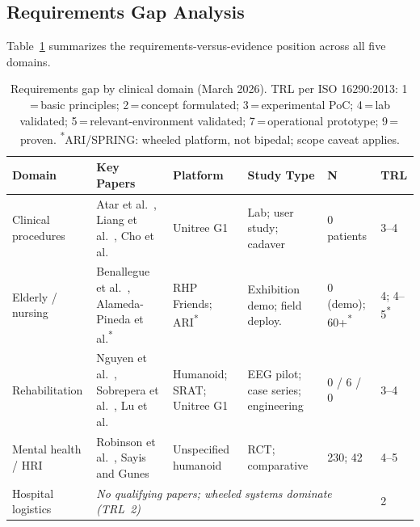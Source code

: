 \documentclass[acmjour]{acmart}
\begin{document}
\subsection{Requirements Gap Analysis}
\label{sec:crossdomain}

Table~\ref{tab:evidence} summarizes the requirements-versus-evidence position
across all five domains.

\begin{table}[t]
  \caption{Requirements gap by clinical domain (March 2026). TRL per ISO
  16290:2013: 1\,=\,basic principles; 2\,=\,concept formulated;
  3\,=\,experimental PoC; 4\,=\,lab validated; 5\,=\,relevant-environment
  validated; 7\,=\,operational prototype; 9\,=\,proven.
  \textsuperscript{*}ARI/SPRING: wheeled platform, not bipedal; scope caveat applies.}
  \label{tab:evidence}
  \footnotesize
  \begin{tabular}{@{}p{2.1cm}p{2.1cm}p{2.0cm}p{1.4cm}p{1.1cm}l@{}}
    \toprule
    \textbf{Domain} & \textbf{Key Papers} & \textbf{Platform} & \textbf{Study Type} & \textbf{N} & \textbf{TRL} \\
    \midrule
    Clinical procedures &
      Atar et al.~\cite{atar2025humanoids}, Liang et al.~\cite{liang2025lapsurgie}, Cho et al.~\cite{cho2026humanoid} &
      Unitree G1 & Lab; user study; cadaver & 0 patients & 3--4 \\[3pt]
    Elderly / nursing &
      Benallegue et al.~\cite{benallegue2025rhp}, Alameda-Pineda et al.\textsuperscript{*}~\cite{alamedapineda2024spring} &
      RHP Friends; ARI\textsuperscript{*} & Exhibition demo; field deploy. &
      0 (demo); 60+\textsuperscript{*} & 4; 4--5\textsuperscript{*} \\[3pt]
    Rehabilitation &
      Nguyen et al.~\cite{nguyen2024eeg}, Sobrepera et al.~\cite{sobrepera2022feasibility}, Lu et al.~\cite{lu2025gentlehumanoid} &
      Humanoid; SRAT; Unitree G1 & EEG pilot; case series; engineering &
      0 / 6 / 0 & 3--4 \\[3pt]
    Mental health / HRI &
      Robinson et al.~\cite{robinson2023brief}, Sayis and Gunes~\cite{sayis2024technology} &
      Unspecified humanoid & RCT; comparative & 230; 42 & 4--5 \\[3pt]
    Hospital logistics & \multicolumn{4}{l}{\emph{No qualifying papers; wheeled systems dominate (TRL~2)}} & 2 \\
    \bottomrule
  \end{tabular}
\end{table}
\end{document}
